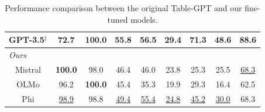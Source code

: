 \documentclass[11pt]{article}
\newcommand{\grayc}[0]{\cellcolor[rgb]{0.957,0.957,0.957}}
\begin{document}
\begin{table}[t]
{\begin{tabular}{c|cccc|cccc}
    GPT-3.5$^\ddagger$ & 72.7 & \textbf{100.0} & \textbf{55.8} & \textbf{56.5} & 29.4 & \textbf{71.3} & \textbf{48.6} & \textbf{88.6} \\ 
\midrule
\multicolumn{9}{l}{\grayc \textit{Ours}} \\
\multicolumn{1}{c|}{Mistral} & \textbf{100.0} & 98.0 & 46.4 & 46.0 & 23.8 & 25.3 & 25.5 & \underline{68.3} \\
\multicolumn{1}{c|}{OLMo} & 96.2 & \textbf{100.0} & 45.4 & 35.3 & 19.9 & 29.3 & 16.4 & 62.5\\
\multicolumn{1}{c|}{Phi} & \underline{98.9} & 98.8 & \underline{49.4} & \underline{55.4} & \underline{24.8} & \underline{45.2} & \underline{30.0} & 68.3 \\
    \bottomrule
    \end{tabular}
    }
    \caption{Performance comparison between the original Table-GPT and our fine-tuned models.
    }
    \label{tab:mistral-tablegpt}
    \vspace{-0.5em}
  \end{table}%
  
  \begin{table}[t]
\centering
    \small
    \renewcommand{\arraystretch}{1.3}
    \setlength\tabcolsep{2pt}
    \scalebox{1}{
    \begin{tabular}{c|cccc|cccc}
    \toprule
   & Beer & DeepM & DI  & ED & C & CF & Wiki & CTA \\
   & (F1) & (Recall) & (Acc) & (F1) & (F1) & (Acc) & (Acc) & (F1)\\
   \midrule
    13K & 98.9 & 92.9 & 45.9 & 43.8 & \textbf{29.4} & 21.2 & 29.2 & 66.8\\
66K & \textbf{100.0} & \textbf{98.0} & \textbf{46.4} & \textbf{46.0} & 23.8 & \textbf{25.3} & \textbf{29.8} & \textbf{68.3} \\
    \bottomrule
    \end{tabular}
    }
    \caption{Performance comparison between training Mistral v0.3 7B Instruct on 13K instances versus 66K instances provided by \citet{li2023table}.
    }
    \label{tab:mistral-tablegpt-side-finding-all}
  \end{table}
\end{document}
